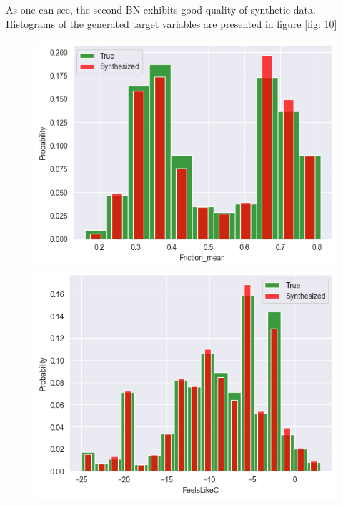 \documentclass[12pt, bachelor, substylefile = algo_title.rtx]{disser}
\theoremstyle{definition}
\begin{document}
As one can see, the second BN exhibits good quality of synthetic data. Histograms of the generated target variables are presented in figure \ref{fig: 10}

\begin{figure}[!h]
   \begin{minipage}{.48\textwidth}
     \includegraphics[width=\linewidth]{bn21}
   \end{minipage} \hfill
\begin{minipage}{.48\textwidth}
     \includegraphics[width=\linewidth]{bn22}
   \end{minipage}\\
\centering
\begin{minipage}{.48\textwidth}

\end{minipage}
\end{figure}
\end{document}
